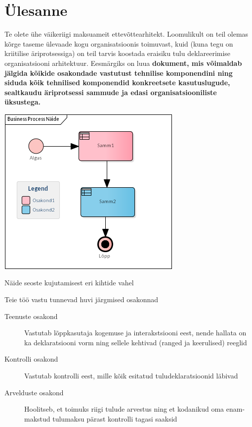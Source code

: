 \documentclass[nobib]{tufte-handout}
\begin{document}
\section{Ülesanne}
Te olete ühe väikeriigi maksuameit ettevõttearhitekt. Loomulikult on teil olemas kõrge taseme ülevaade kogu organisatsioonis toimuvast, kuid (kuna tegu on kriitilise äriprotsessiga) on teil tarvis koostada eraisiku tulu deklareerimise organisatsiooni arhitektuur. Eesmärgiks on luua \textbf{dokument, mis võimaldab jälgida kõikide osakondade vastutust tehnilise komponendini ning siduda kõik tehnilised komponendid konkreetsete kasutuslugude, sealtkaudu äriprotsessi sammude ja edasi organisatsiooniliste üksustega.}
\begin{marginfigure}%
  \includegraphics[width=\linewidth]{bpmn.png}
  \caption{Näide seoste kujutamisest eri kihtide vahel}
  \label{fig:bpmn}
\end{marginfigure}


Teie töö vastu tunnevad huvi järgmised osakonnad
\begin{description}
	\item[Teenuste osakond] Vastutab lõppkasutaja kogemuse ja interakstsiooni eest, nende hallata on ka deklaratsiooni vorm ning sellele kehtivad (ranged ja keerulised) reeglid
	\item[Kontrolli osakond] Vastutab kontrolli eest, mille kõik esitatud tuludeklaratsioonid läbivad
	\item[Arvelduste osakond] Hoolitseb, et toimuks riigi tulude arvestus ning et kodanikud oma enam-makstud tulumaksu pärast kontrolli tagasi saaksid
\end{description}
\end{document}
